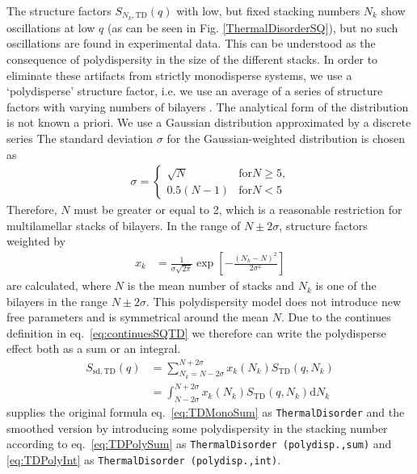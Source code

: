 The structure factors $S_{N_k,\mathrm{TD}}(q)$ with low, but fixed
stacking numbers $N_k$ show oscillations at low $q$ (as can be seen in
Fig. \ref{ThermalDisorderSQ}), but no such oscillations are found in
experimental data. This can be understood as the consequence of
polydispersity in the size of the different stacks. In order to
eliminate these artifacts from strictly monodisperse systems, we use
a `polydisperse' structure factor, i.e. we use an average of a
series of structure factors with varying numbers of bilayers
\cite{Fruhwirth2004}. The analytical form of the distribution is not
known a priori. We use a Gaussian distribution approximated by a
discrete series The standard deviation $\sigma$ for the
Gaussian-weighted distribution is chosen as
\begin{align}
\sigma =
\begin{cases}
\sqrt{N} & \text{for} N\geq 5 \text{,} \\
0.5(N-1) & \text{for} N< 5
\end{cases}
\end{align}
Therefore, $N$ must be greater or equal to 2, which is a
reasonable restriction for multilamellar stacks of bilayers. In
the range of $N \pm 2\sigma$, structure factors weighted by
\begin{align}
x_k & = \frac{1}{\sigma\sqrt{2\pi}} \exp\left[
-\frac{(N_k-N)^2}{2\sigma^2}\right]
\end{align}
are calculated, where $N$ is the mean number of stacks and $N_k$
is one of the  bilayers in the range $N\pm 2\sigma$. This
polydispersity model does not introduce new free parameters and is
symmetrical around the mean $N$. Due to the continues definition in eq.\ \ref{eq:continuesSQTD} we therefore can write the polydisperse effect both as a sum or an integral.
\begin{align}
  S_\mathrm{sd,TD}(q) & = \sum_{N_k=N-2\sigma}^{N+2\sigma} x_k(N_k) S_\mathrm{TD}(q,N_k) \label{eq:TDPolySum} \\
                      & = \int_{N-2\sigma}^{N+2\sigma} x_k(N_k) S_\mathrm{TD}(q,N_k) \mathrm{d}N_k \label{eq:TDPolyInt}
\end{align}
\SASfit supplies the original formula eq.\ \ref{eq:TDMonoSum} as  \texttt{ThermalDisorder} and the smoothed version by introducing some polydispersity in the stacking number according to eq.\ \ref{eq:TDPolySum} as \texttt{ThermalDisorder (polydisp.,sum)} and \ref{eq:TDPolyInt} as \texttt{ThermalDisorder (polydisp.,int)}.


\vspace{5mm}

